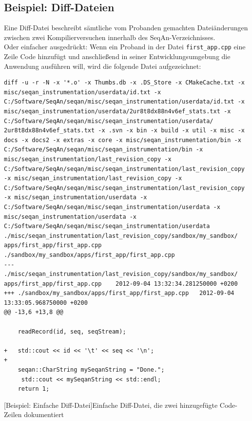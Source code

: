\subsection{Beispiel: Diff-Dateien}

Eine Diff-Datei beschreibt sämtliche vom Probanden gemachten Dateiänderungen zwischen zwei Kompilierversuchen innerhalb des SeqAn-Verzeichnisses.\\
Oder einfacher ausgedrückt: Wenn ein Proband in der Datei \texttt{first\_app.cpp} eine Zeile Code hinzufügt und anschließend in seiner Entwicklungsumgebung die Anwendung ausführen will, wird die folgende Datei aufgezeichnet:

\begin{center}
\begin{verbatim}
diff -u -r -N -x '*.o' -x Thumbs.db -x .DS_Store -x CMakeCache.txt -x misc/seqan_instrumentation/userdata/id.txt -x C:/Software/SeqAn/seqan/misc/seqan_instrumentation/userdata/id.txt -x misc/seqan_instrumentation/userdata/2ur8t8dx88n4v6ef_stats.txt -x C:/Software/SeqAn/seqan/misc/seqan_instrumentation/userdata/ 2ur8t8dx88n4v6ef_stats.txt -x .svn -x bin -x build -x util -x misc -x docs -x docs2 -x extras -x core -x misc/seqan_instrumentation/bin -x C:/Software/SeqAn/seqan/misc/seqan_instrumentation/bin -x misc/seqan_instrumentation/last_revision_copy -x C:/Software/SeqAn/seqan/misc/seqan_instrumentation/last_revision_copy -x misc/seqan_instrumentation/last_revision_copy -x C:/Software/SeqAn/seqan/misc/seqan_instrumentation/last_revision_copy -x misc/seqan_instrumentation/userdata -x C:/Software/SeqAn/seqan/misc/seqan_instrumentation/userdata -x misc/seqan_instrumentation/userdata -x C:/Software/SeqAn/seqan/misc/seqan_instrumentation/userdata ./misc/seqan_instrumentation/last_revision_copy/sandbox/my_sandbox/ apps/first_app/first_app.cpp ./sandbox/my_sandbox/apps/first_app/first_app.cpp
--- ./misc/seqan_instrumentation/last_revision_copy/sandbox/my_sandbox/ apps/first_app/first_app.cpp	2012-09-04 13:32:34.281250000 +0200
+++ ./sandbox/my_sandbox/apps/first_app/first_app.cpp	2012-09-04 13:33:05.968750000 +0200
@@ -13,6 +13,8 @@
 	
 	readRecord(id, seq, seqStream);
 
+	std::cout << id << '\t' << seq << '\n';
+
 	seqan::CharString mySeqanString = "Done.";
     std::cout << mySeqanString << std::endl;
 	return 1;
\end{verbatim}
[Beispiel: Einfache Diff-Datei]{Einfache Diff-Datei, die zwei hinzugefügte Code-Zeilen dokumentiert}
\label{lst:diff-file}
\end{center}
  
